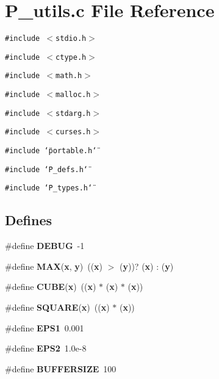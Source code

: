 \section{P\_\-utils.c File Reference}
\label{P__utils_8c}
{\tt \#include $<$stdio.h$>$}\par
{\tt \#include $<$ctype.h$>$}\par
{\tt \#include $<$math.h$>$}\par
{\tt \#include $<$malloc.h$>$}\par
{\tt \#include $<$stdarg.h$>$}\par
{\tt \#include $<$curses.h$>$}\par
{\tt \#include \char`\"{}portable.h\char`\"{}}\par
{\tt \#include \char`\"{}P\_\-defs.h\char`\"{}}\par
{\tt \#include \char`\"{}P\_\-types.h\char`\"{}}\par
\subsection*{Defines}
\begin{CompactItemize}
\item 
\#define {\bf DEBUG}\ -1
\item 
\#define {\bf MAX}({\bf x}, {\bf y})\ (({\bf x}) $>$ ({\bf y}))? ({\bf x}) : ({\bf y})
\item 
\#define {\bf CUBE}({\bf x})\ (({\bf x}) $\ast$ ({\bf x}) $\ast$ ({\bf x}))
\item 
\#define {\bf SQUARE}({\bf x})\ (({\bf x}) $\ast$ ({\bf x}))
\item 
\#define {\bf EPS1}\ 0.001
\item 
\#define {\bf EPS2}\ 1.0e-8
\item 
\#define {\bf BUFFERSIZE}\ 100
\end{CompactItemize}
